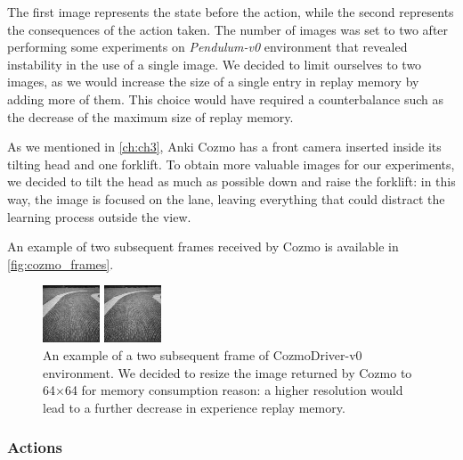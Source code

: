 The first image represents the state before the action, while the second represents the consequences of the action taken.
The number of images was set to two after performing some experiments on \textit{Pendulum-v0} environment that revealed instability in the use of a single image.
We decided to limit ourselves to two images, as we would increase the size of a single entry in replay memory by adding more of them.
This choice would have required a counterbalance such as the decrease of the maximum size of replay memory.

As we mentioned in \vref{ch:ch3}, Anki Cozmo has a front camera inserted inside its tilting head and one forklift.
To obtain more valuable images for our experiments, we decided to tilt the head as much as possible down and raise the forklift: in this way, the image is focused on the lane, leaving everything that could distract the learning process outside the view.

An example of two subsequent frames received by Cozmo is available in \vref{fig:cozmo_frames}.
\begin{figure}

    \begin{minipage}[t]{0.5\linewidth}
        \centering
        \includegraphics[height=0.25\paperwidth]{img/cozmo_frame_1.jpg}
    \end{minipage}
    \begin{minipage}[t]{0.5\linewidth}
        \centering
        \includegraphics[height=0.25\paperwidth]{img/cozmo_frame_2.jpg}
    \end{minipage}

    \caption[Example of two subsequent frames of CozmoDriver-v0]{An example of a two subsequent frame of CozmoDriver-v0 environment.
        We decided to resize the image returned by Cozmo to 64$\times$64 for memory consumption reason: a higher resolution would lead to a further decrease in experience replay memory.}
    \label{fig:cozmo_frames}
\end{figure}

\subsubsection{Actions}

